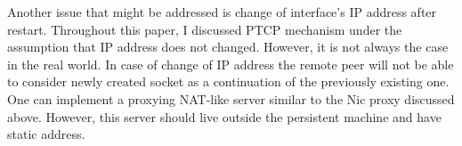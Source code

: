 Another issue that might be addressed is change of interface's IP address after
restart. Throughout this paper, I discussed PTCP mechanism under the assumption
that IP address does not changed. However, it is not always the case in the
real world. In case of change of IP address the remote peer will not be able
to consider newly created socket as a continuation of the previously existing
one. One can implement a proxying NAT-like server similar to the Nic proxy
discussed above. However, this server should live outside the persistent
machine and have static address.

